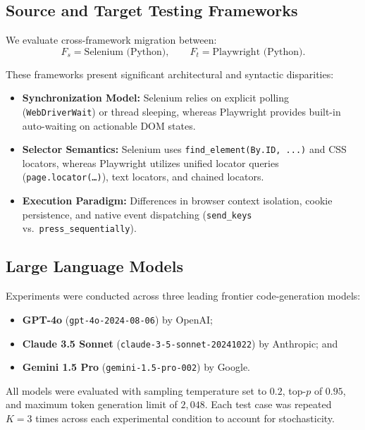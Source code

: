 \documentclass[pdflatex,sn-mathphys-num]{sn-jnl}
\begin{document}
\subsection{Source and Target Testing Frameworks}
\label{subsec:frameworks}

We evaluate cross-framework migration between:
\begin{equation}
    F_s = \text{Selenium (Python)},
    \qquad
    F_t = \text{Playwright (Python)}.
\end{equation}

These frameworks present significant architectural and syntactic disparities:
\begin{itemize}[leftmargin=*]
    \item \textbf{Synchronization Model:} Selenium relies on explicit polling
    (\texttt{WebDriverWait}) or thread sleeping, whereas Playwright provides
    built-in auto-waiting on actionable DOM states.
    \item \textbf{Selector Semantics:} Selenium uses \texttt{find\_element(By.ID, ...)}
    and CSS locators, whereas Playwright utilizes unified locator queries
    (\texttt{page.locator(\dots)}), text locators, and chained locators.
    \item \textbf{Execution Paradigm:} Differences in browser context isolation,
    cookie persistence, and native event dispatching (\texttt{send\_keys} vs.\
    \texttt{press\_sequentially}).
\end{itemize}

\subsection{Large Language Models}
\label{subsec:models}

Experiments were conducted across three leading frontier code-generation models:
\begin{itemize}[leftmargin=*]
    \item \textbf{GPT-4o} (\texttt{gpt-4o-2024-08-06}) by OpenAI;
    \item \textbf{Claude 3.5 Sonnet} (\texttt{claude-3-5-sonnet-20241022}) by Anthropic; and
    \item \textbf{Gemini 1.5 Pro} (\texttt{gemini-1.5-pro-002}) by Google.
\end{itemize}

All models were evaluated with sampling temperature set to $0.2$, top-$p$ of $0.95$,
and maximum token generation limit of $2{,}048$. Each test case was repeated
$K = 3$ times across each experimental condition to account for stochasticity.
\end{document}
